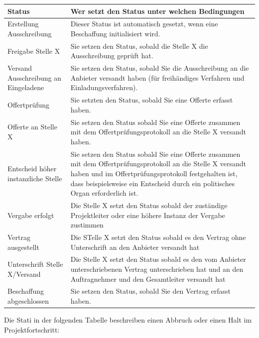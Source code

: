 \begin{tabular}{|p{5cm}|p{9.5cm}|}    %
\hline
\textbf{Status} & \textbf{Wer setzt den Status unter welchen Bedingungen} \\
\hline
Erstellung Ausschreibung & Dieser Status ist automatisch gesetzt, wenn eine Beschaffung initialisiert wird. \\
\hline
Freigabe Stelle X & Sie setzen den Status, sobald die Stelle X die Ausschreibung geprüft hat. \\
\hline
Versand Ausschreibung an Eingeladene & Sie setzen den Status, sobald Sie die Ausschreibung an die Anbieter versandt haben (für freihändiges
Verfahren und Einladungsverfahren). \\
\hline
Offertprüfung & Sie setzten den Status, sobald Sie eine Offerte erfasst haben. \\
\hline
Offerte an Stelle X & Sie setzen den Status sobald Sie eine Offerte zusammen mit dem Offertprüfungsprotokoll an die Stelle X versandt haben. \\
\hline
Entscheid höher instanzliche Stelle & Sie setzen den Status sobald Sie eine Offerte zusammen mit dem Offertprüfungsprotokoll an die Stelle X versandt haben und im Offertprüfungsprotokoll festgehalten ist, dass beispielsweise ein Entscheid durch ein politisches Organ erforderlich ist. \\
\hline
Vergabe erfolgt & Die Stelle X setzt den Status sobald der zuständige Projektleiter oder eine höhere Instanz der Vergabe zustimmen \\
\hline
Vertrag ausgestellt & Die STelle X setzt den Status sobald es den Vertrag ohne Unterschrift an den Anbieter versandt hat \\
\hline
Unterschrift Stelle X/Versand & Die Stelle X setzt den Status sobald es den vom Anbieter unterschriebenen Vertrag unterschrieben hat und an den Auftragnehmer und den Gesamtleiter versandt hat \\
\hline
Beschaffung abgeschlossen & Sie setzen den Status, sobald Sie den Vertrag erfasst haben. \\
\hline
\end{tabular}

\vspace{\baselineskip}

Die Stati in der folgenden Tabelle beschreiben einen Abbruch oder einen Halt im Projektfortschritt:

\vspace{\baselineskip}

